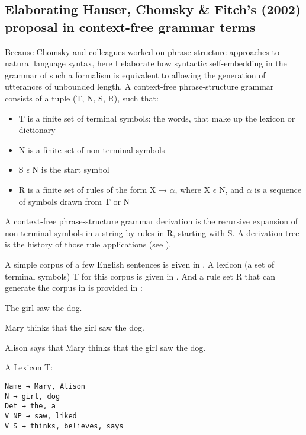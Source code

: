 \documentclass{article}
\begin{document}
\subsection{Elaborating Hauser, Chomsky \& Fitch's (2002) proposal in context-free grammar terms}

Because Chomsky and colleagues worked on phrase structure approaches to natural language syntax, here I elaborate how syntactic self-embedding in the grammar of such a formalism is equivalent to allowing the generation of utterances of unbounded length. A context-free phrase-structure grammar consists of a tuple (T, N, S, R), such that:

\begin{itemize}
    \item T is a finite set of terminal symbols: the words, that make up the lexicon or dictionary
    \item N is a finite set of non-terminal symbols
    \item S $\epsilon$ N is the start symbol
    \item R is a finite set of rules of the form X → $\alpha$, where X $\epsilon$ N, and $\alpha$ is a sequence of symbols drawn from T or N
\end{itemize}

A context-free phrase-structure grammar derivation is the recursive expansion of non-terminal symbols in a string by rules in R, starting with S. A derivation tree is the history of those rule applications (see \cite{chomsky1959certain, lewis1998elements, hopcroft2001introduction}).

A simple corpus of a few English sentences is given in . A lexicon (a set of terminal symbols) T for this corpus is given in . And a rule set R that can generate the corpus in  is provided in :

\begin{myexample}
\label{corpus1}
\begin{examples}
\item \label{corpus1a} The girl saw the dog.
\item \label{corpus1c} Mary thinks that the girl saw the dog.
\item \label{corpus1d} Alison says that Mary thinks that the girl saw the dog.
\end{examples}
\end{myexample}

\begin{myexample}
\label{lexicon1}
A Lexicon T:
\begin{verbatim}
Name → Mary, Alison
N → girl, dog
Det → the, a
V_NP → saw, liked
V_S → thinks, believes, says
\end{verbatim}
\end{myexample}
\end{document}
